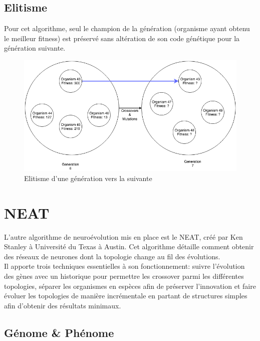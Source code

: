 \documentclass{article}
\begin{document}
\subsection{Elitisme}

Pour cet algorithme, seul le champion de la génération (organisme ayant obtenu le meilleur fitness) est préservé sans altération de son code génétique pour la génération suivante.

\begin{figure}[h]
\begin{center}
	\includegraphics[scale=0.5]{elitism.png}
	\caption{Elitisme d'une génération vers la suivante}
\end{center}
\end{figure}

\newpage
\section{NEAT}

L'autre algorithme de neuroévolution mis en place est le NEAT, créé par Ken Stanley à Université du Texas à Austin. Cet algorithme détaille comment obtenir des réseaux de neurones dont la topologie change au fil des évolutions.\\
Il apporte trois techniques essentielles à son fonctionnement: suivre l'évolution des gènes avec un historique pour permettre les crossover parmi les différentes topologies, séparer les organismes en espèces afin de préserver l'innovation et faire évoluer les topologies de manière incrémentale en partant de structures simples afin d'obtenir des résultats minimaux.\cite{wikineat}

\subsection{Génome \& Phénome}
\end{document}
